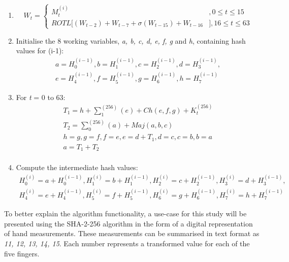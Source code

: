     \begin{enumerate}
        
        \item \[W_t=\begin{cases}
                        M^{(i)}_t &, 0 \leq t \leq 15\\
                        ROTL[(W_{t-2}) + W_{t-7} + \sigma(W_{t-15}) + W_{t-16}  &], 16 \leq t \leq 63
                        \end{cases}\]
 
        
        \item Initialise the 8 working variables, \textit{a, b, c, d, e, f, g} and \textit{h}, containing hash values for (i-1): 
            \begin{gather*}     
                a = H^{(i-1)}_0, b = H^{(i-1)}_1, c = H^{(i-1)}_2, d = H^{(i-1)}_3, \\
                e = H^{(i-1)}_4, f = H^{(i-1)}_5, g = H^{(i-1)}_6, h = H^{(i-1)}_7 
            \end{gather*}
        \item For \textit{t} = 0 to 63:
            \begin{gather*}
                T_1 = h + \sum_{1}^{(256)}(e) + Ch(e,f,g) + K^{(256)}_t \\
                T_2 = \sum_{0}^{(256)}(a) + Maj(a,b,c) \\
                h = g, g = f, f = e, e = d + T_1, d = c, c = b, b = a \\
                a = T_1 + T_2 \\
            \end{gather*}
        
        \item Compute the intermediate hash values:
            \begin{gather*}
                H^{(i)}_0 = a + H^{(i-1)}_0, H^{(i)}_1 = b + H^{(i-1)}_1, H^{(i)}_2 = c + H^{(i-1)}_2, H^{(i)}_3 = d + H^{(i-1)}_3, \\ 
                H^{(i)}_4 = e + H^{(i-1)}_4, H^{(i)}_5 = f + H^{(i-1)}_5, H^{(i)}_6 = g + H^{(i-1)}_6, H^{(i)}_7 = h + H^{(i-1)}_7
            \end{gather*}
    \end{enumerate}
    
    To better explain the algorithm functionality, a use-case for this study will be presented using the SHA-2-256 algorithm in the form of a digital representation of hand measurements. These measurements can be summarised in text format as \textit{11, 12, 13, 14, 15}. Each number represents a transformed value for each of the five fingers.
    
